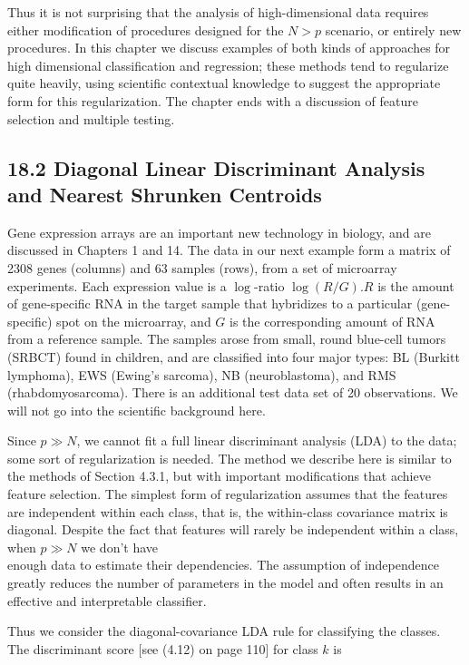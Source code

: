\documentclass[10pt]{article}
\begin{document}
Thus it is not surprising that the analysis of high-dimensional data requires either modification of procedures designed for the $N>p$ scenario, or entirely new procedures. In this chapter we discuss examples of both kinds of approaches for high dimensional classification and regression; these methods tend to regularize quite heavily, using scientific contextual knowledge to suggest the appropriate form for this regularization. The chapter ends with a discussion of feature selection and multiple testing.

\subsection*{18.2 Diagonal Linear Discriminant Analysis and Nearest Shrunken Centroids}
Gene expression arrays are an important new technology in biology, and are discussed in Chapters 1 and 14. The data in our next example form a matrix of 2308 genes (columns) and 63 samples (rows), from a set of microarray experiments. Each expression value is a $\log$-ratio $\log (R / G) . R$ is the amount of gene-specific RNA in the target sample that hybridizes to a particular (gene-specific) spot on the microarray, and $G$ is the corresponding amount of RNA from a reference sample. The samples arose from small, round blue-cell tumors (SRBCT) found in children, and are classified into four major types: BL (Burkitt lymphoma), EWS (Ewing's sarcoma), NB (neuroblastoma), and RMS (rhabdomyosarcoma). There is an additional test data set of 20 observations. We will not go into the scientific background here.

Since $p \gg N$, we cannot fit a full linear discriminant analysis (LDA) to the data; some sort of regularization is needed. The method we describe here is similar to the methods of Section 4.3.1, but with important modifications that achieve feature selection. The simplest form of regularization assumes that the features are independent within each class, that is, the within-class covariance matrix is diagonal. Despite the fact that features will rarely be independent within a class, when $p \gg N$ we don't have\\
enough data to estimate their dependencies. The assumption of independence greatly reduces the number of parameters in the model and often results in an effective and interpretable classifier.

Thus we consider the diagonal-covariance LDA rule for classifying the classes. The discriminant score [see (4.12) on page 110] for class $k$ is
\end{document}
